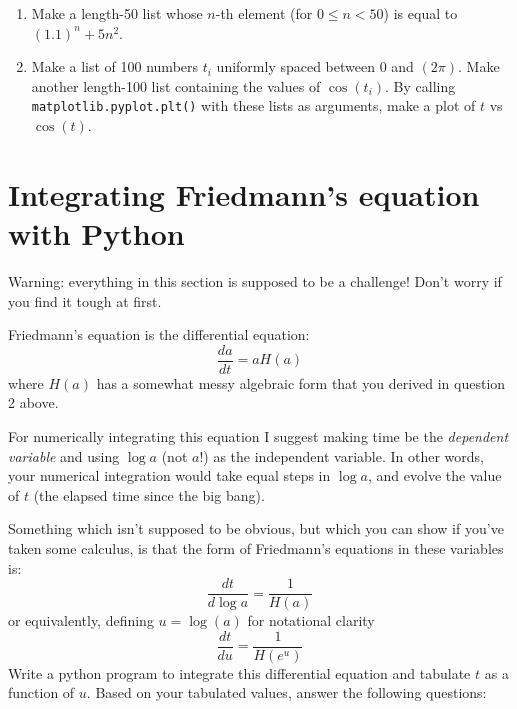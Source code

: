 \documentclass[aps,prd,superscriptaddress,groupedaddress,nofootinbib,nobibnotes]{revtex4}
\newcommand{\be}{\begin{equation}}
\newcommand{\ee}{\end{equation}}
\begin{document}
\begin{enumerate}[resume]

\item Make a length-50 list whose $n$-th element (for $0 \le n < 50$) is equal to $(1.1)^n + 5n^2$.

\item Make a list of 100 numbers $t_i$ uniformly spaced between 0 and $(2\pi)$.
  Make another length-100 list containing the values of $\cos(t_i)$.  By calling
  {\tt matplotlib.pyplot.plt()} with these lists as arguments, make a plot of $t$ vs $\cos(t)$.

\end{enumerate}

\section{Integrating Friedmann's equation with Python}

\par\noindent
Warning: everything in this section is supposed to be a challenge!
Don't worry if you find it tough at first.

Friedmann's equation is the differential equation:
\be
\frac{da}{dt} = a H(a)
\ee
where $H(a)$ has a somewhat messy algebraic form that you derived in question 2 above.

For numerically integrating this equation I suggest making time be the {\em dependent variable}
and using $\log a$ (not $a$!) as the independent variable.  In other words, your numerical integration
would take equal steps in $\log a$, and evolve the value of $t$ (the elapsed time since the big bang).

Something which isn't supposed to be obvious, but which you can show if you've taken some calculus,
is that the form of Friedmann's equations in these variables is:
\be
\frac{dt}{d\log a} = \frac{1}{H(a)}
\ee
or equivalently, defining $u=\log(a)$ for notational clarity
\be
\frac{dt}{du} = \frac{1}{H(e^u)}
\ee
Write a python program to integrate this differential equation and tabulate $t$ as a function of $u$.
Based on your tabulated values, answer the following questions:
\end{document}
